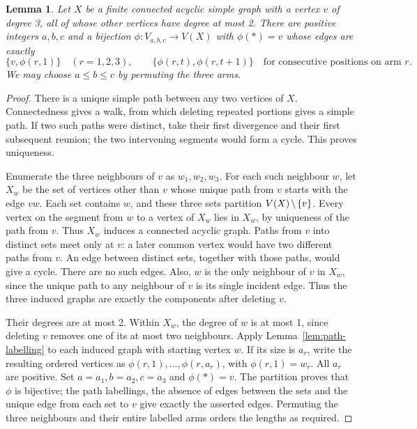 \documentclass[11pt]{amsart}
\newcommand\diff{\mathbin{\mkern-1.5mu\setminus\mkern-1.5mu}}%
\newtheorem{lemma}[theorem]{Lemma}
\theoremstyle{definition}
\begin{document}
\begin{lemma}\label{lem:arm-labelling}
Let $X$ be a finite connected acyclic simple graph with a vertex $v$ of
degree 3, all of whose other vertices have degree at most 2. There are
positive integers $a,b,c$ and a bijection
$\phi:V_{a,b,c}\to V(X)$ with $\phi(*)=v$ whose edges are exactly
\[
 \{v,\phi(r,1)\}\quad(r=1,2,3),\qquad
 \{\phi(r,t),\phi(r,t+1)\}\quad
   \text{for consecutive positions on arm }r.
\]
We may choose $a\leq b\leq c$ by permuting the three arms.
\end{lemma}
\begin{proof}
There is a unique simple path between any two vertices of $X$.
Connectedness gives a walk, from which deleting repeated portions gives
a simple path. If two such paths were distinct, take their first
divergence and their first subsequent reunion; the two intervening
segments would form a cycle. This proves uniqueness.

Enumerate the three neighbours of $v$ as $w_1,w_2,w_3$. For each such
neighbour $w$, let $X_w$ be the set of vertices other than $v$ whose
unique path from $v$ starts with the edge $vw$. Each set contains $w$,
and these three sets partition $V(X)\diff\{v\}$. Every vertex on the
segment from $w$ to a vertex of $X_w$ lies in $X_w$, by uniqueness of
the path from $v$. Thus $X_w$ induces a connected acyclic graph.
Paths from $v$ into distinct sets meet only at $v$: a later common
vertex would have two different paths from $v$. An edge between distinct
sets, together with those paths, would give a cycle. There
are no such edges. Also, $w$ is the only neighbour of $v$ in $X_w$,
since the unique path to any neighbour of $v$ is its single incident edge.
Thus the three induced graphs are exactly the components after deleting $v$.

Their degrees are at most 2. Within $X_w$, the degree of $w$ is at
most 1, since deleting $v$ removes one of its at most two neighbours.
Apply Lemma~\ref{lem:path-labelling} to each induced graph with starting
vertex $w$. If its size is $a_r$, write the resulting ordered vertices
as $\phi(r,1),\ldots,\phi(r,a_r)$, with $\phi(r,1)=w_r$.
All $a_r$ are positive. Set $a=a_1,b=a_2,c=a_3$ and $\phi(*)=v$.
The partition proves that $\phi$ is bijective; the path labellings, the
absence of edges between the sets and the unique edge from each set to
$v$ give exactly the asserted edges. Permuting the three neighbours
and their entire labelled arms orders the lengths as required.
\end{proof}
\end{document}
